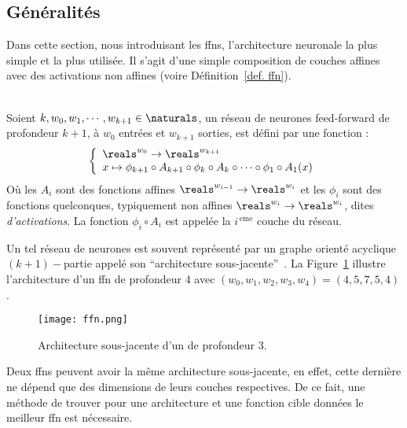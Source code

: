 \subsection{Généralités}

Dans cette section, nous introduisant les \glspl{ffn},
l'architecture neuronale la plus simple et la plus utilisée.
Il s'agit d'une simple composition de couches affines avec des activations non affines 
(voire Définition~\ref{def. ffn}).


\begin{definition}\ \\
    \label{def. ffn}
    Soient \(k, w_0, w_1, \cdots, w_{k+1}\in\naturals\), 
    un réseau de neurones feed-forward de profondeur \(k+1\), à \(w_0\) entrées et \(w_{k+1}\) sorties, 
    est défini par une fonction :
    \begin{equation}
        \label{eq. ffn}
        \left\{
        \begin{array}{l}
            \reals^{w_0} \to \reals^{w_{k+1}}\\
            x\mapsto
            \phi_{k+1} \circ A_{k+1} \circ \phi_k \circ A_k \circ \cdots \circ \phi_1 \circ A_1(x)
        \end{array}
        \right.
    \end{equation}
    Où les \(A_i\) sont des fonctions affines \(\reals^{w_{i-1}}\to\reals^{w_i}\) 
    et les \(\phi_i\) sont des fonctions quelconques, typiquement non affines
    \(\reals^{w_i}\to\reals^{w_i}\), dites \emph{d'activations}.
    La fonction \(\phi_i\circ A_i\) est appelée la \(i^{\, \mathrm{eme}}\) couche du réseau.
\end{definition}

Un tel réseau de neurones est souvent représenté par 
un graphe orienté acyclique \((k+1)-\)partie  appelé son ``architecture sous-jacente''~\parencite{Kearns_Vazirani_1994}. 
La Figure~\ref{fig. ffn} illustre l'architecture d'un \gls{ffn} de profondeur 4
avec \((w_0, w_1, w_2, w_3, w_4) = (4, 5, 7, 5, 4)\).


\begin{figure}[hbt]
    \begin{center}
        \texttt{[image: ffn.png]}
    \end{center}
    \caption{Architecture sous-jacente d'un  de profondeur 3.}
    \label{fig. ffn}
\end{figure}

Deux \glspl{ffn} peuvent avoir la même architecture sous-jacente,
en effet, cette dernière ne dépend que des dimensions de leurs couches respectives.
De ce fait, une méthode de trouver pour une architecture et une fonction cible données 
le meilleur \gls{ffn} est nécessaire.

